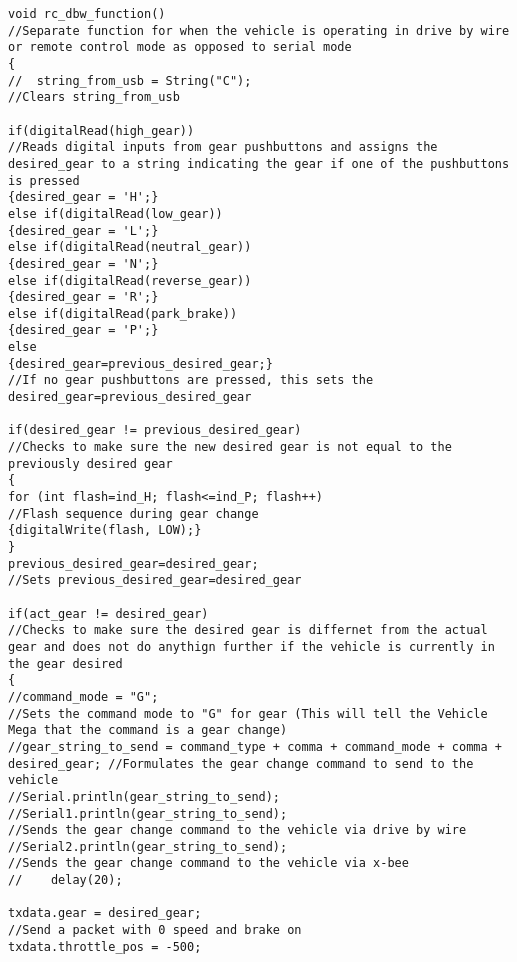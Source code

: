 \begin{lstlisting}[breaklines=true,basicstyle=\tiny]
void rc_dbw_function()                                                               //Separate function for when the vehicle is operating in drive by wire or remote control mode as opposed to serial mode
{
//  string_from_usb = String("C");                                                     //Clears string_from_usb 

if(digitalRead(high_gear))                                                   //Reads digital inputs from gear pushbuttons and assigns the desired_gear to a string indicating the gear if one of the pushbuttons is pressed
{desired_gear = 'H';}
else if(digitalRead(low_gear))
{desired_gear = 'L';}
else if(digitalRead(neutral_gear))
{desired_gear = 'N';}
else if(digitalRead(reverse_gear))
{desired_gear = 'R';}
else if(digitalRead(park_brake))
{desired_gear = 'P';}
else
{desired_gear=previous_desired_gear;}                                               //If no gear pushbuttons are pressed, this sets the desired_gear=previous_desired_gear

if(desired_gear != previous_desired_gear)                                         //Checks to make sure the new desired gear is not equal to the previously desired gear
{
for (int flash=ind_H; flash<=ind_P; flash++)                                    //Flash sequence during gear change
{digitalWrite(flash, LOW);}
}
previous_desired_gear=desired_gear;                                               //Sets previous_desired_gear=desired_gear

if(act_gear != desired_gear)                                                      //Checks to make sure the desired gear is differnet from the actual gear and does not do anythign further if the vehicle is currently in the gear desired
{
//command_mode = "G";                                                               //Sets the command mode to "G" for gear (This will tell the Vehicle Mega that the command is a gear change)
//gear_string_to_send = command_type + comma + command_mode + comma + desired_gear; //Formulates the gear change command to send to the vehicle
//Serial.println(gear_string_to_send);
//Serial1.println(gear_string_to_send);                                             //Sends the gear change command to the vehicle via drive by wire
//Serial2.println(gear_string_to_send);                                             //Sends the gear change command to the vehicle via x-bee
//    delay(20);

txdata.gear = desired_gear;                                             //Send a packet with 0 speed and brake on
txdata.throttle_pos = -500;


\end{lstlisting}
